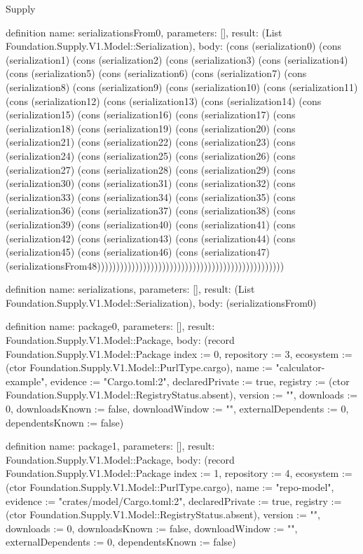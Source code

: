 \begin{lexlean}{Supply}
\begin{semanticmodule}
definition{
  name: serializationsFrom0,
  parameters: [],
  result: (List Foundation.Supply.V1.Model::Serialization),
  body: (cons (serialization0) (cons (serialization1) (cons (serialization2) (cons (serialization3) (cons (serialization4) (cons (serialization5) (cons (serialization6) (cons (serialization7) (cons (serialization8) (cons (serialization9) (cons (serialization10) (cons (serialization11) (cons (serialization12) (cons (serialization13) (cons (serialization14) (cons (serialization15) (cons (serialization16) (cons (serialization17) (cons (serialization18) (cons (serialization19) (cons (serialization20) (cons (serialization21) (cons (serialization22) (cons (serialization23) (cons (serialization24) (cons (serialization25) (cons (serialization26) (cons (serialization27) (cons (serialization28) (cons (serialization29) (cons (serialization30) (cons (serialization31) (cons (serialization32) (cons (serialization33) (cons (serialization34) (cons (serialization35) (cons (serialization36) (cons (serialization37) (cons (serialization38) (cons (serialization39) (cons (serialization40) (cons (serialization41) (cons (serialization42) (cons (serialization43) (cons (serialization44) (cons (serialization45) (cons (serialization46) (cons (serialization47) (serializationsFrom48)))))))))))))))))))))))))))))))))))))))))))))))))
}

definition{
  name: serializations,
  parameters: [],
  result: (List Foundation.Supply.V1.Model::Serialization),
  body: (serializationsFrom0)
}

definition{
  name: package0,
  parameters: [],
  result: Foundation.Supply.V1.Model::Package,
  body: (record Foundation.Supply.V1.Model::Package {index := 0, repository := 3, ecosystem := (ctor Foundation.Supply.V1.Model::PurlType.cargo), name := "calculator-example", evidence := "Cargo.toml:2", declaredPrivate := true, registry := (ctor Foundation.Supply.V1.Model::RegistryStatus.absent), version := "", downloads := 0, downloadsKnown := false, downloadWindow := "", externalDependents := 0, dependentsKnown := false})
}

definition{
  name: package1,
  parameters: [],
  result: Foundation.Supply.V1.Model::Package,
  body: (record Foundation.Supply.V1.Model::Package {index := 1, repository := 4, ecosystem := (ctor Foundation.Supply.V1.Model::PurlType.cargo), name := "repo-model", evidence := "crates/model/Cargo.toml:2", declaredPrivate := true, registry := (ctor Foundation.Supply.V1.Model::RegistryStatus.absent), version := "", downloads := 0, downloadsKnown := false, downloadWindow := "", externalDependents := 0, dependentsKnown := false})
}


\end{semanticmodule}
\end{lexlean}
